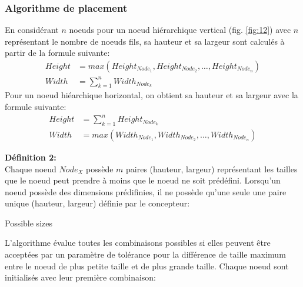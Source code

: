 
\subsubsection{Algorithme de placement}
En considérant $n$ noeuds pour un noeud hiérarchique vertical (fig. \ref{fig:12}) avec $n$ représentant le nombre de noeuds fils, sa hauteur et sa largeur sont calculés à partir de la formule suivante:
\begin{subequations}
\begin{align}
Height &= max(Height_{Node_1}, Height_{Node_2}, \hdots, Height_{Node_n})\\
Width  &= \sum_{k=1}^{n} Width_{Node_k} 
\end{align}
\end{subequations}
Pour un noeud hiéarchique horizontal, on obtient sa hauteur et sa largeur avec la formule suivante:
\begin{subequations}
\begin{align}
Height &= \sum_{k=1}^{n} Height_{Node_k} \\
Width  &=  max(Width_{Node_1}, Width_{Node_2}, \hdots, Width_{Node_n})
\end{align}
\end{subequations}

{\bf \noindent  Définition 2:} \\
Chaque noeud $Node_X$ possède $m$ paires (hauteur, largeur) représentant les tailles que le noeud peut prendre à moins que le noeud ne soit prédéfini. Lorsqu'un noeud possède des dimensions prédifinies, il ne possède qu'une seule une paire unique (hauteur, largeur) définie par le concepteur:

\begin{algorithm}
\caption{Possible sizes}
\end{algorithm}

L'algorithme évalue toutes les combinaisons possibles si elles peuvent être acceptées par un paramètre de tolérance pour la différence de taille maximum entre le noeud de plus petite taille et de plus grande taille. Chaque noeud sont initialisés avec leur première combinaison:

